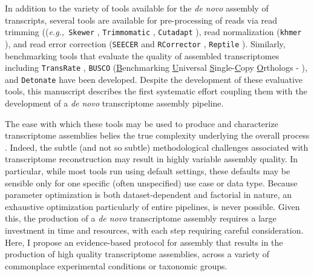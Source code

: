 \documentclass[10.5pt]{article}
\newcommand{\eg}{\textit{e.g.,}}
\newcommand{\tit}{\textit}
\begin{document}
{In addition to the variety of tools available for the \tit{de novo} assembly of transcripts, several tools are available for pre-processing of reads via read trimming ((\eg\ \texttt{Skewer} \citep{Jiang:2014cx}, \texttt{Trimmomatic} \citep{Bolger:2014ek}, \texttt{Cutadapt} \cite{Martin:2011va}), read normalization (\texttt{khmer} \citep{Pell:2012id}), and read error correction (\texttt{SEECER} \citep{Le:2013dy} and \texttt{RCorrector} \citep{Song:2015in}, \texttt{Reptile} \cite{Yang:2010kv}). Similarly, benchmarking tools that evaluate the quality of assembled transcriptomes including \texttt{TransRate} \citep{SmithUnna:2016go}, \texttt{BUSCO} (\underline{B}enchmarking \underline{U}niversal \underline{S}ingle-\underline{C}opy \underline{O}rthologs - \citep{Simao:2015kk}), and \texttt{Detonate} \citep{Li:2014cm} have been developed. Despite the development of these evaluative tools, this manuscript describes the first systematic effort coupling them with the development of a \textit{de novo} transcriptome assembly pipeline.

The ease with which these tools may be used to produce and characterize transcriptome assemblies belies the true complexity underlying the overall process \citep{Ungaro:2017kf, Wang:2017gc, Moreton:2015fw, Yang:2013iz}. Indeed, the subtle (and not so subtle) methodological challenges associated with transcriptome reconstruction may result in highly variable assembly quality. In particular, while most tools run using default settings, these defaults may be sensible only for one specific (often unspecified) use case or data type. Because parameter optimization is both dataset-dependent and factorial in nature, an exhaustive optimization particularly of entire pipelines, is never possible. Given this, the production of a \tit{de novo} transcriptome assembly requires a large investment in time and resources, with each step requiring careful consideration. Here, I propose an evidence-based protocol for assembly that results in the production of high quality transcriptome assemblies, across a variety of commonplace experimental conditions or taxonomic groups. \\

}
\end{document}
